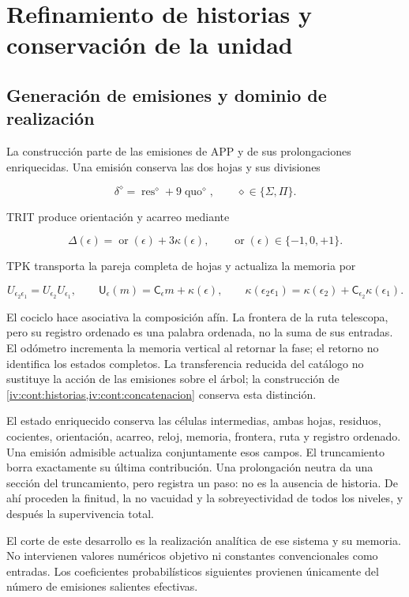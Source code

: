 \section{Refinamiento de historias y conservación de la unidad}
\label{nuclear:1}
\subsection{Generación de emisiones y dominio de realización}

La construcción parte de las emisiones de APP y de sus prolongaciones enriquecidas. Una emisión conserva las dos hojas y sus divisiones

\[
\delta^\diamond=\operatorname{res}^\diamond+9\operatorname{quo}^\diamond,
\qquad \diamond\in\{\Sigma,\Pi\}.
\]

TRIT produce orientación y acarreo mediante

\[
\Delta(\epsilon)=\operatorname{or}(\epsilon)+3\kappa(\epsilon),
\qquad \operatorname{or}(\epsilon)\in\{-1,0,+1\}.
\]

TPK transporta la pareja completa de hojas y actualiza la memoria por

\[
U_{\epsilon_2\epsilon_1}=U_{\epsilon_2}U_{\epsilon_1},\qquad
\mathsf U_\epsilon(m)=\mathsf C_\epsilon m+\kappa(\epsilon),\qquad
\kappa(\epsilon_2\epsilon_1)
=\kappa(\epsilon_2)+\mathsf C_{\epsilon_2}\kappa(\epsilon_1).
\]

El cociclo hace asociativa la composición afín. La frontera de la ruta telescopa, pero su registro ordenado es una palabra ordenada, no la suma de sus entradas. El odómetro incrementa la memoria vertical al retornar la fase; el retorno no identifica los estados completos. La transferencia reducida del catálogo no sustituye la acción de las emisiones sobre el árbol; la construcción de \cref{iv:cont:historias,iv:cont:concatenacion} conserva esta distinción.

El estado enriquecido conserva las células intermedias, ambas hojas, residuos, cocientes, orientación, acarreo, reloj, memoria, frontera, ruta y registro ordenado. Una emisión admisible actualiza conjuntamente esos campos. El truncamiento borra exactamente su última contribución. Una prolongación neutra da una sección del truncamiento, pero registra un paso: no es la ausencia de historia. De ahí proceden la finitud, la no vacuidad y la sobreyectividad de todos los niveles, y después la supervivencia total.

El corte de este desarrollo es la realización analítica de ese sistema y su memoria. No intervienen valores numéricos objetivo ni constantes convencionales como entradas. Los coeficientes probabilísticos siguientes provienen únicamente del número de emisiones salientes efectivas.

